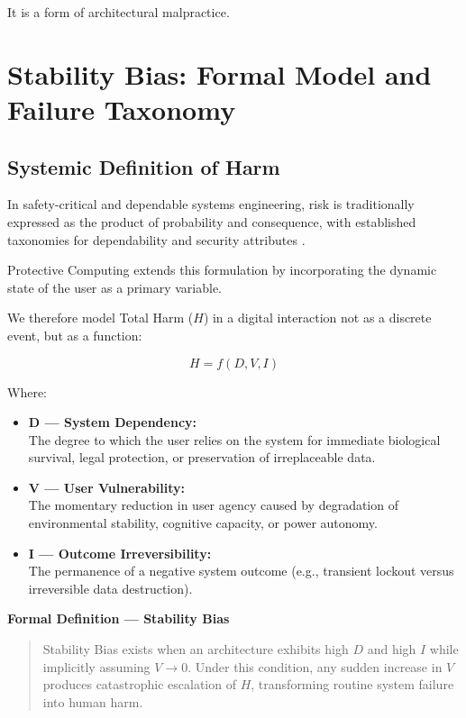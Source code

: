 \documentclass[12pt]{article}
\begin{document}
It is a form of architectural malpractice.

\section{Stability Bias: Formal Model and Failure Taxonomy}

\subsection{Systemic Definition of Harm}
In safety-critical and dependable systems engineering, risk is traditionally expressed as the product of probability and consequence, with established taxonomies for dependability and security attributes \cite{avizienis2004dependability}.

Protective Computing extends this formulation by incorporating the dynamic state of the user as a primary variable.

We therefore model Total Harm ($H$) in a digital interaction not as a discrete event, but as a function:

\[
H = f(D, V, I)
\]

Where:

\begin{itemize}
\item \textbf{D --- System Dependency:}\\
  The degree to which the user relies on the system for immediate biological survival, legal protection, or preservation of irreplaceable data.
\item \textbf{V --- User Vulnerability:}\\
  The momentary reduction in user agency caused by degradation of environmental stability, cognitive capacity, or power autonomy.
\item \textbf{I --- Outcome Irreversibility:}\\
  The permanence of a negative system outcome (e.g., transient lockout versus irreversible data destruction).
\end{itemize}

\textbf{Formal Definition --- Stability Bias}

\begin{quote}
Stability Bias exists when an architecture exhibits high $D$ and high $I$ while implicitly assuming $V \rightarrow 0$.
Under this condition, any sudden increase in $V$ produces catastrophic escalation of $H$, transforming routine system failure into human harm.
\end{quote}
\end{document}

